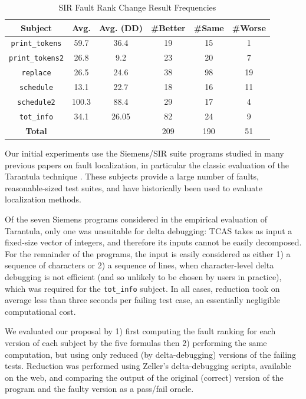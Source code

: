 \begin{table}
\begin{center}
\begin{tabular}{|c||c|c|c|c|c|}
\hline
\hline

\hline
Subject & Avg. & Avg. (DD) & \#Better & \#Same & \#Worse \\
\hline
\hline
{\tt print\_tokens} & 59.7 & 36.4 & 19 & 15 & 1  \\
\hline
{\tt print\_tokens2} & 26.8 & 9.2 & 23 & 20 & 7  \\
\hline
{\tt replace} & 26.5 & 24.6 & 38 & 98 & 19  \\
\hline
{\tt schedule} & 13.1 & 22.7 & 18 & 16 & 11  \\
\hline
{\tt schedule2} & 100.3 & 88.4 & 29 & 17 & 4 \\ 
\hline
{\tt tot\_info} & 34.1 & 26.05 & 82 & 24 & 9 \\
\hline
\hline
{\bf Total} & & & 209 & 190 & 51  \\
\hline
\hline
\end{tabular}
\end{center}
\caption{SIR Fault Rank Change Result Frequencies}
\label{tab:avgimproved}
\end{table}

Our initial experiments use the Siemens/SIR \cite{doESE05,Siemens}
suite programs studied in many previous papers on fault localization,
in particular the classic evaluation of the Tarantula technique
\cite{Tarantula}.  These subjects provide a large number of faults,
reasonable-sized test suites, and have historically been used to
evaluate localization methods.

Of the seven Siemens programs considered in the empirical evaluation
of Tarantula, only one was unsuitable for delta debugging: TCAS takes
as input a fixed-size vector of integers, and therefore its inputs
cannot be easily decomposed.  For the remainder of the programs, the
input is easily considered as either 1) a sequence of characters or 2)
a sequence of lines, when character-level delta debugging is not
efficient (and so unlikely to be chosen by users in practice), which
was required for the {\tt tot\_info} subject.  In all cases, reduction
took on average less than three seconds per failing test case, an essentially
negligible computational cost.



We evaluated our proposal by 1) first computing the fault ranking for
each version of each subject by the five formulas then 2) performing
the same computation, but using only reduced (by delta-debugging)
versions of the failing tests.  Reduction was performed using Zeller's
delta-debugging scripts, available on the web, and comparing the output
of the original (correct) version of the program and the faulty
version as a pass/fail oracle.

